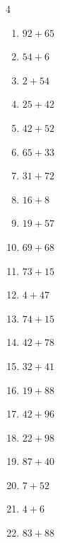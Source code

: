 \begin{multicols}{4}
\begin{enumerate}
  \item $92+65$
        \phantom{$=157$}

  \item $54+6$
        \phantom{$=60$}

  \item $2+54$
        \phantom{$=56$}

  \item $25+42$
        \phantom{$=67$}

  \item $42+52$
        \phantom{$=94$}

  \item $65+33$
        \phantom{$=98$}

  \item $31+72$
        \phantom{$=103$}

  \item $16+8$
        \phantom{$=24$}

  \item $19+57$
        \phantom{$=76$}

  \item $69+68$
        \phantom{$=137$}

  \item $73+15$
        \phantom{$=88$}

  \item $4+47$
        \phantom{$=51$}

  \item $74+15$
        \phantom{$=89$}

  \item $42+78$
        \phantom{$=120$}

  \item $32+41$
        \phantom{$=73$}

  \item $19+88$
        \phantom{$=107$}

  \item $42+96$
        \phantom{$=138$}

  \item $22+98$
        \phantom{$=120$}

  \item $87+40$
        \phantom{$=127$}

  \item $7+52$
        \phantom{$=59$}

  \item $4+6$
        \phantom{$=10$}

  \item $83+88$
        \phantom{$=171$}


\end{enumerate}
\end{multicols}
